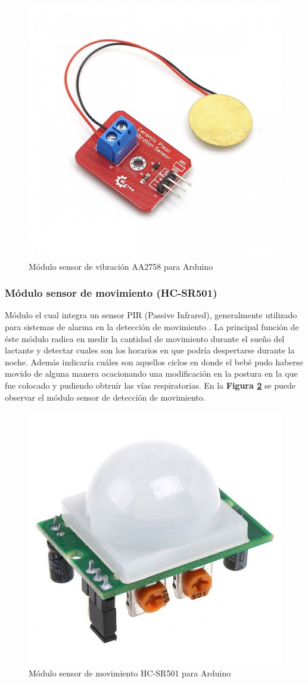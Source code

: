 \documentclass{IEEEtran}
\begin{document}
				\begin{figure}
					\centering
					\includegraphics[width=0.5\linewidth]{arduino-modulo-vibracion}
					\caption{Módulo sensor de vibración AA2758 para Arduino}
					\label{arduino-modulo-vibracion}
				\end{figure}

			\subsubsection{Módulo sensor de movimiento (\textbf{HC-SR501})}
			
				Módulo el cual integra un sensor PIR (Passive Infrared), generalmente utilizado para sistemas de alarma en la detección de movimiento \cite{movimientotecnico}. La principal función de éste módulo radica en medir la cantidad de movimiento durante el sueño del lactante y detectar cuales son los horarios en que podría despertarse durante la noche. Además indicaría cuáles son aquellos ciclos en donde el bebé pudo haberse movido de alguna manera ocacionando una modificación en la postura en la que fue colocado y pudiendo obtruír las vías respiratorias. En la \textbf{Figura \ref{arduino-modulo-movimiento}} se puede observar el módulo sensor de detección de movimiento.

				\begin{figure}
					\centering
					\includegraphics[width=0.5\linewidth]{arduino-modulo-movimiento}
					\caption{Módulo sensor de movimiento HC-SR501 para Arduino}
					\label{arduino-modulo-movimiento}
				\end{figure}
\end{document}
